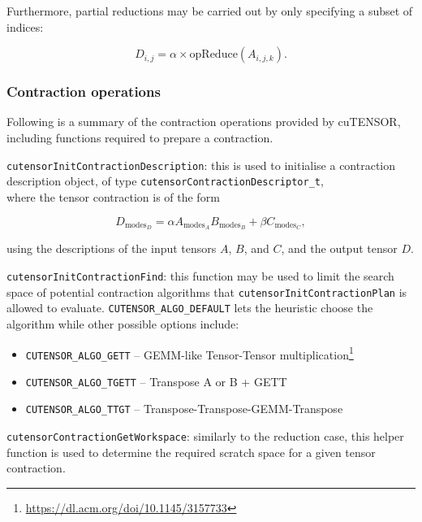 \documentclass[12pt]{article}
\begin{document}
Furthermore, partial reductions may be carried out by only specifying a subset of indices:

\begin{equation*}
D_{i,j} = \alpha \times \mathrm{opReduce}(A_{i,j,k}).
\end{equation*}

\subsubsection{Contraction operations} \label{cutensor::contraction}
Following is a summary of the contraction operations provided by cuTENSOR, including functions required to prepare a contraction.

\vspace{0.5em}\texttt{cutensorInitContractionDescription}: this is used to initialise a contraction description object, of type \texttt{cutensorContractionDescriptor\_t}, \\where the tensor contraction is of the form

\begin{equation*}
D_{\mathrm{modes}_D} = \alpha A_{\mathrm{modes}_A} B_{\mathrm{modes}_B} + \beta C_{\mathrm{modes}_C},
\end{equation*}

\noindent using the descriptions of the input tensors $A$, $B$, and $C$, and the output tensor $D$.

\vspace{0.5em}\texttt{cutensorInitContractionFind}: this function may be used to limit the search space of potential contraction algorithms that \texttt{cutensorInitContr\-actionPlan} is allowed to evaluate. \texttt{CUTENSOR\_ALGO\_DEFAULT} lets the heuristic choose the algorithm while other possible options include:

\begin{itemize}
\item \texttt{CUTENSOR\_ALGO\-\_GETT} -- GEMM-like Tensor-Tensor multiplication\footnote{\url{https://dl.acm.org/doi/10.1145/3157733}}
\item \texttt{CUTENSOR\_ALGO\_TGETT} -- Transpose A or B + GETT
\item \texttt{CUTENSOR\_ALGO\_TTGT} -- Transpose-Transpose-GEMM-Transpose
\end{itemize}


\vspace{0.5em}\texttt{cutensorContractionGetWorkspace}: similarly to the reduction case, this helper function is used to determine the required scratch space for a given tensor contraction.
\end{document}
